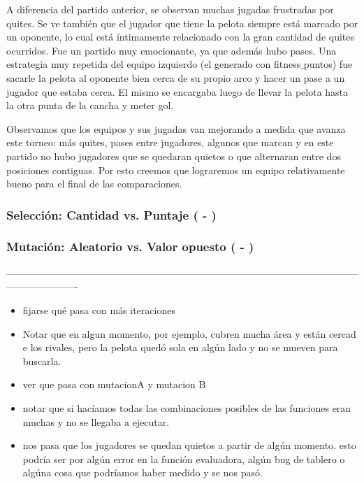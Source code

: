 
A diferencia del partido anterior, se observan muchas jugadas frustradas por quites.
Se ve también que el jugador que tiene la pelota siempre está marcado por un oponente, lo cual está íntimamente relacionado con la gran cantidad de quites ocurridos.
Fue un partido muy emocionante, ya que además hubo pases.
Una estrategia muy repetida del equipo izquierdo (el generado con fitness$\_$puntos) fue sacarle la pelota al oponente bien cerca de su propio arco y hacer un pase a un jugador que estaba cerca.
El mismo se encargaba luego de llevar la pelota hasta la otra punta de la cancha y meter gol.

Observamos que los equipos y sus jugadas van mejorando a medida que avanza este torneo: más quites, pases entre jugadores, algunos que marcan y en este partido no hubo jugadores que se quedaran quietos o que alternaran entre dos posiciones contiguas.
Por esto creemos que lograremos un equipo relativamente bueno para el final de las comparaciones.



\subsubsection*{Selección: Cantidad vs. Puntaje ( - )}
\subsubsection*{Mutación: Aleatorio vs. Valor opuesto ( - )}

----------------------------------------------------------------------------------------------------------------------------------
\begin{itemize}
    \item fijarse qué pasa con más iteraciones
    \item Notar que en algun momento, por ejemplo, cubren mucha área y están cercad e los rivales, pero la pelota quedó sola en algún lado y no se mueven para buscarla.
    \item ver que pasa con mutacionA y mutacion B
    \item notar que si hacíamos todas las combinaciones posibles de las funciones eran muchas y no se llegaba a ejecutar.
    \item nos pasa que los jugadores se quedan quietos a partir de algún momento. esto podría ser por algún error en la función evaluadora, algún bug de tablero o algúna cosa que podríamos haber medido y se nos pasó.
\end{itemize}

